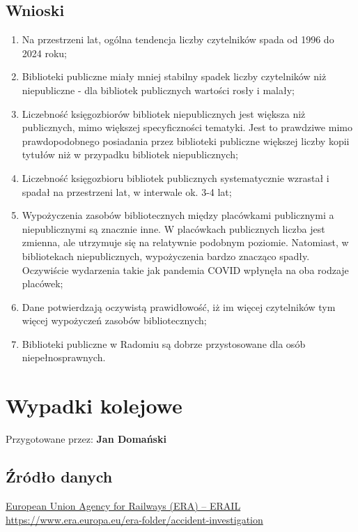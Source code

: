 \documentclass[12pt]{article}
\begin{document}
\subsection{Wnioski}
\begin{enumerate}
    \item Na przestrzeni lat, ogólna tendencja liczby czytelników spada od 1996 do 2024 roku;
    \item Biblioteki publiczne miały mniej stabilny spadek liczby czytelników niż niepubliczne - dla bibliotek publicznych wartości 
            rosły i malały;
    \item Liczebność księgozbiorów bibliotek niepublicznych jest większa niż publicznych, mimo większej specyficzności tematyki. 
            Jest to prawdziwe mimo prawdopodobnego posiadania przez biblioteki publiczne większej liczby kopii tytułów niż 
            w przypadku bibliotek niepublicznych;
    \item Liczebność księgozbioru bibliotek publicznych systematycznie wzrastał i spadał na przestrzeni lat, w interwale 
            ok. 3-4 lat;
    \item Wypożyczenia zasobów bibliotecznych między placówkami publicznymi a niepublicznymi są znacznie inne. W placówkach publicznych 
            liczba jest zmienna, ale utrzymuje się na relatywnie podobnym poziomie. Natomiast, w bibliotekach niepublicznych, 
            wypożyczenia bardzo znacząco spadły. Oczywiście wydarzenia takie jak pandemia COVID wpłynęła na oba rodzaje placówek;
    \item Dane potwierdzają oczywistą prawidłowość, iż im więcej czytelników tym więcej wypożyczeń zasobów bibliotecznych;
    \item Biblioteki publiczne w Radomiu są dobrze przystosowane dla osób niepełnosprawnych.
\end{enumerate}


\newpage


\section{Wypadki kolejowe}

Przygotowane przez: \textbf{Jan Domański}

\subsection{Źródło danych}
\href{https://www.era.europa.eu/era-folder/accident-investigation}{European Union Agency for Railways (ERA) – ERAIL}\\
\url{https://www.era.europa.eu/era-folder/accident-investigation}
\end{document}

